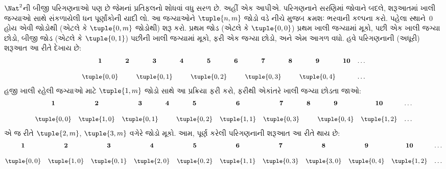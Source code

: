 \begin{explain}
$\Nat^2$ની બીજી પરિગણનાઓ પણ છે જેમનાં પ્રતિફલનો
શોધવાં વધુ સરળ છે. અહીં એક આપીએ.
પરિગણનાને સરણિમાં જોવાને બદલે, શરૂઆતમાં ખાલી
જગ્યાઓ સાથે સંકળાયેલી ધન પૂર્ણાંકોની યાદી લો.
આ જગ્યાઓને $\tuple{n,m}$ જોડો વડે નીચે મુજબ
ક્રમશઃ ભરવાની કલ્પના કરો. પહેલા સ્થાને~$0$ હોય
એવી જોડોથી (એટલે કે $\tuple{0,m}$ જોડોથી) શરૂ કરો.
પ્રથમ જોડ (એટલે કે $\tuple{0,0}$) પ્રથમ ખાલી
જગ્યામાં મૂકો, પછી એક ખાલી જગ્યા છોડો, બીજી જોડ
(એટલે કે $\tuple{0,1}$) પછીની ખાલી જગ્યામાં મૂકો,
ફરી એક જગ્યા છોડો, અને એમ આગળ વધો.
હવે પરિગણનાની (અધૂરી) શરૂઆત આ રીતે દેખાય છે:
\[\small
\begin{array}{@{}c c c c c c c c c c c@{}}
\mathbf 1 & \mathbf 2 & \mathbf 3 & \mathbf 4 & \mathbf 5 & \mathbf 6 & \mathbf 7 & \mathbf 8 & \mathbf 9 & \mathbf{10} & \dots \\ \\
\tuple{0,0} &  & \tuple{0,1} &  & \tuple{0,2} &  & \tuple{0,3} & & \tuple{0,4} &  & \dots \\
\end{array}
\]
હજી ખાલી રહેલી જગ્યાઓ માટે $\tuple{1,m}$ જોડો
સાથે આ પ્રક્રિયા ફરી કરો, ફરીથી એકાંતરે ખાલી
જગ્યા છોડતા જાઓ:
\[\small
\begin{array}{@{}c c c c c c c c c c c@{}}
\mathbf 1 & \mathbf 2 & \mathbf 3 & \mathbf 4 & \mathbf 5 & \mathbf 6 & \mathbf 7 & \mathbf 8 & \mathbf 9 & \mathbf{10} & \dots \\ \\
\tuple{0,0} & \tuple{1,0} & \tuple{0,1} &  & \tuple{0,2} & \tuple{1,1} &
\tuple{0,3} & & \tuple{0,4} &  \tuple{1,2} & \dots \\
\end{array}
\]
એ જ રીતે $\tuple{2,m}$, $\tuple{3,m}$ વગેરે
જોડો મૂકો. આમ, પૂર્ણ કરેલી પરિગણનાની શરૂઆત
આ રીતે થાય છે:
\[\small
\begin{array}{@{}cc c c c c c c c c c@{}}
\mathbf 1 & \mathbf 2 & \mathbf 3 & \mathbf 4 & \mathbf 5 & \mathbf 6 & \mathbf 7 & \mathbf 8 & \mathbf 9 & \mathbf{10} & \dots \\ \\
\tuple{0,0} & \tuple{1,0} & \tuple{0,1} & \tuple{2,0}  & \tuple{0,2} &
\tuple{1,1} & \tuple{0,3} & \tuple{3,0}  & \tuple{0,4} &  \tuple{1,2} & \dots \\
\end{array}
\]
\end{explain}
